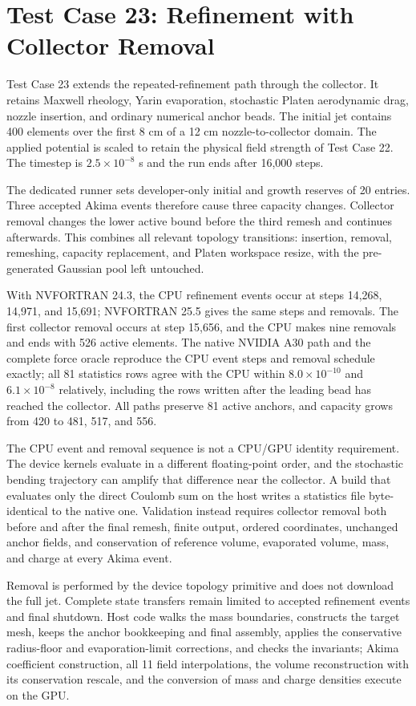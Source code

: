 \section{Test Case 23: Refinement with Collector Removal}

Test Case 23 extends the repeated-refinement path through the collector. It
retains Maxwell rheology, Yarin evaporation, stochastic Platen aerodynamic
drag, nozzle insertion, and ordinary numerical anchor beads. The initial jet
contains 400 elements over the first 8 cm of a 12 cm nozzle-to-collector
domain. The applied potential is scaled to retain the physical field strength
of Test Case 22. The timestep is $2.5\times10^{-8}$ s and the run ends after
16,000 steps.

The dedicated runner sets developer-only initial and growth reserves of 20
entries. Three accepted Akima events therefore cause three capacity changes.
Collector removal changes the lower active bound before the third remesh and
continues afterwards. This combines all relevant topology transitions:
insertion, removal, remeshing, capacity replacement, and Platen workspace
resize, with the pre-generated Gaussian pool left untouched.

With NVFORTRAN 24.3, the CPU refinement events occur at steps 14,268, 14,971,
and 15,691; NVFORTRAN 25.5 gives the same steps and removals. The first collector removal
occurs at step 15,656, and the CPU makes nine removals and ends with 526 active
elements. The native NVIDIA A30 path and the complete force oracle reproduce
the CPU event steps and removal schedule exactly; all 81 statistics rows agree
with the CPU within $8.0\times10^{-10}$ and $6.1\times10^{-8}$ relatively,
including the rows written after the leading bead has reached the collector.
All paths preserve 81 active anchors, and capacity grows from 420 to 481, 517,
and 556.

The CPU event and removal sequence is not a CPU/GPU identity requirement.
The device kernels evaluate in a different floating-point order, and the
stochastic bending trajectory can amplify that difference near the
collector.  A build that evaluates only the direct Coulomb sum on the host
writes a statistics file byte-identical to the native one. Validation instead requires collector removal both before
and after the final remesh, finite output, ordered coordinates, unchanged
anchor fields, and conservation of reference volume, evaporated volume, mass,
and charge at every Akima event.

Removal is performed by the device topology primitive and does not download
the full jet. Complete state transfers remain limited to accepted refinement
events and final shutdown. Host code walks the mass boundaries, constructs
the target mesh, keeps the anchor bookkeeping and final assembly, applies the
conservative radius-floor and evaporation-limit corrections, and checks the
invariants; Akima coefficient construction, all 11 field interpolations, the
volume reconstruction with its conservation rescale, and the conversion of
mass and charge densities execute on the GPU.

